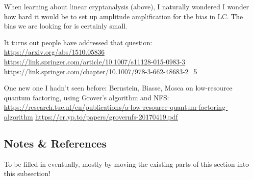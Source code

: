 When learning about linear cryptanalysis (above), I naturally wondered
I wonder how hard it would be to set up amplitude amplification for
the bias in LC.  The bias we are looking for is certainly small.

It turns out people have addressed that question:
\url{https://arxiv.org/abs/1510.05836}
\url{https://link.springer.com/article/10.1007/s11128-015-0983-3}
\url{https://link.springer.com/chapter/10.1007/978-3-662-48683-2_5}

One new one I hadn't seen before:
Bernstein, Biasse, Mosca on low-resource quantum factoring, using
Grover's algorithm and NFS:
\url{https://research.tue.nl/en/publications/a-low-resource-quantum-factoring-algorithm}
\url{https://cr.yp.to/papers/grovernfs-20170419.pdf}

\subsection{Notes \& References}

To be filled in eventually, mostly by moving the existing parts of
this section into this subsection!

